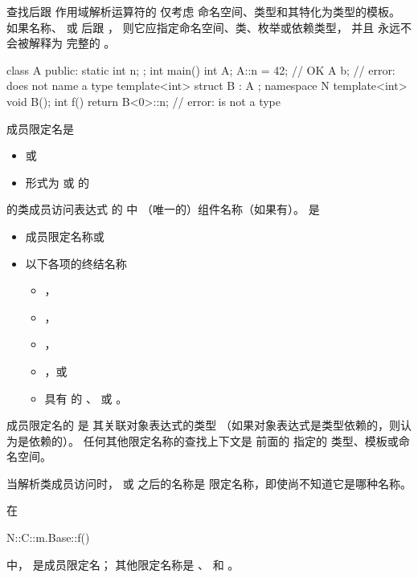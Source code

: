 \pnum
{}%
%
%
查找后跟 \tcode{::} 作用域解析运算符的 
仅考虑
命名空间、类型和其特化为类型的模板。
如果名称、 或 
后跟 \tcode{::}，
则它应指定命名空间、类、枚举或依赖类型，
并且 \tcode{::} 永远不会被解释为
完整的 。
\begin{example}
\begin{codeblock}
class A {
public:
  static int n;
};
int main() {
  int A;
  A::n = 42;            // OK
  A b;                  // error:  does not name a type
}
template<int> struct B : A {};
namespace N {
  template<int> void B();
  int f() {
    return B<0>::n;     // error:  is not a type
  }
}
\end{codeblock}
\end{example}

\pnum
{}%
%

\pnum
成员限定名是
\begin{itemize}
\item
{} 或
\item
形式为
 \tcode{::} 或  \tcode{::} 的 
\end{itemize}
的类成员访问表达式 的  中
（唯一的）组件名称（如果有）。
 是
\begin{itemize}
\item 成员限定名称或
\item 以下各项的终结名称
\begin{itemize}
\item {}，
\item {}，
\item {}，
\item {}，或
\item 具有  的 、
 或
。
\end{itemize}
\end{itemize}
成员限定名的  是
其关联对象表达式的类型
（如果对象表达式是类型依赖的，则认为是依赖的）。
任何其他限定名称的查找上下文是
前面的  指定的
类型、模板或命名空间。
\begin{note}
当解析类成员访问时，
\tcode{->} 或  之后的名称是
限定名称，即使尚不知道它是哪种名称。
\end{note}
\begin{example}
在
\begin{codeblock}
  N::C::m.Base::f()
\end{codeblock}
中， 是成员限定名；
其他限定名称是 、 和 。
\end{example}

